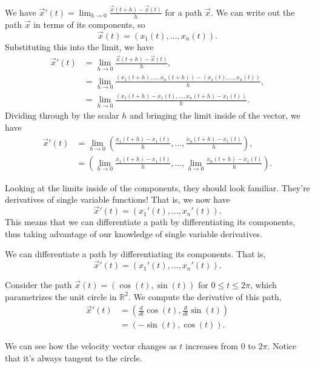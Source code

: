 \documentclass{ximera}
\begin{document}
We have $\vec{x}'(t) = \lim_{h\rightarrow 0} \frac{\vec{x}(t+h) - \vec{x}(t)}{h}$ for a path $\vec{x}$. We can write out the path $\vec{x}$ in terms of its components, so
\[
\vec{x}(t) = (x_1(t),...,x_n(t)).
\]
Substituting this into the limit, we have
\begin{align*}
\vec{x}'(t) &= \lim_{h\rightarrow 0} \frac{\vec{x}(t+h) - \vec{x}(t)}{h},\\
&= \lim_{h\rightarrow 0}\frac{(x_1(t+h),...,x_n(t+h)) - (x_1(t),...,x_n(t))}{h},\\
&= \lim_{h\rightarrow 0}\frac{(x_1(t+h) - x_1(t),...,x_n(t+h) - x_1(t))}{h}.
\end{align*}
Dividing through by the scalar $h$ and bringing the limit inside of the vector, we have 
\begin{align*}
\vec{x}'(t) &= \lim_{h\rightarrow 0}\left(\frac{x_1(t+h) - x_1(t)}{h},...,\frac{x_n(t+h) - x_1(t)}{h}\right),\\
&= \left(\lim_{h\rightarrow 0}\frac{x_1(t+h) - x_1(t)}{h},...,\lim_{h\rightarrow 0}\frac{x_n(t+h) - x_1(t)}{h}\right).
\end{align*}

Looking at the limits inside of the components, they should look familiar. They're derivatives of single variable functions! That is, we now have 
\[
\vec{x}'(t) = (x_1'(t),...,x_n'(t)).
\]
This means that we can differentiate a path by differentiating its components, thus taking advantage of our knowledge of single variable derivatives.

\begin{proposition}
We can differentiate a path by differentiating its components. That is,
\[
\vec{x}'(t) = (x_1'(t),...,x_n'(t)).
\]
\end{proposition}

\begin{example}
Consider the path $\vec{x}(t) = (\cos(t), \sin(t))$ for $0\leq t\leq 2\pi$, which parametrizes the unit circle in $\mathbb{R}^2$. We compute the derivative of this path,
\begin{align*}
\vec{x}'(t) &= \left(\frac{d}{dt}\cos(t), \frac{d}{dt}\sin(t)\right)\\
&= \left(-\sin(t), \cos(t)\right).
\end{align*}

We can see how the velocity vector changes as $t$ increases from $0$ to $2\pi$. Notice that it's always tangent to the circle.


\end{example}
\end{document}
